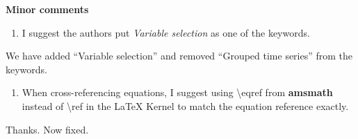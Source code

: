 \documentclass[11pt,a4paper,]{article}
\providecommand{\tightlist}{%
  \setlength{\itemsep}{0pt}\setlength{\parskip}{0pt}}
\renewenvironment{quote}
               {\list{}{\rightmargin\leftmargin}%
                \item\relax\color[RGB]{0,150,0}}
               {\endlist}
\begin{document}
\textbf{Minor comments}

\begin{enumerate}
\def\labelenumi{\arabic{enumi}.}
\tightlist
\item
  I suggest the authors put \emph{Variable selection} as one of the
  keywords.
\end{enumerate}

\begin{quote}
We have added ``Variable selection'' and removed ``Grouped time series''
from the keywords.
\end{quote}

\begin{enumerate}
\def\labelenumi{\arabic{enumi}.}
\setcounter{enumi}{1}
\tightlist
\item
  When cross-referencing equations, I suggest using \textbackslash eqref
  from \textbf{amsmath} instead of \textbackslash ref in the LaTeX
  Kernel to match the equation reference exactly.
\end{enumerate}

\begin{quote}
Thanks. Now fixed.
\end{quote}

\printbibliography
\end{document}
